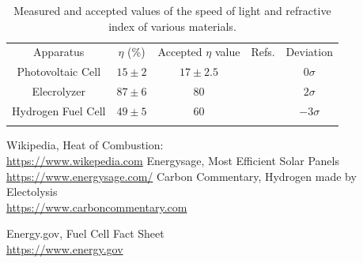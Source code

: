 \documentclass[aps,prl,reprint]{revtex4-2}
\begin{document}
\begin{widetext}
\begin{center}
\begin{table}[h]
\renewcommand{\arraystretch}{1.35}
\setlength{\tabcolsep}{10pt}
\caption{\label{}Measured and accepted values of the speed of light and refractive index of various materials.}
\begin{tabular}{|c|c|c|c|c|}
\toprule
Apparatus &  $\eta$ (\%) & Accepted $\eta$ value & Refs. & Deviation \\
\colrule
Photovoltaic Cell &  $15 \pm 2$ & $17 \pm 2.5$ & \cite{Solar Cell} & $0\sigma$  \\
\colrule
Elecrolyzer &  $87 \pm 6$ & 80 & \cite{Electrolyzer} & $2\sigma$  \\
\colrule
Hydrogen Fuel Cell &  $49 \pm 5$ & 60 & \cite{Fuel Cell} & $-3\sigma$  \\
\botrule
\end{tabular}
\end{table}
\end{center}
\end{widetext}





\begin{thebibliography}{9}
%
Wikipedia, Heat of Combustion: \\
\href{https://en.wikipedia.org/wiki/Heat_of_combustion}{https://www.wikepedia.com}
%
Energysage, Most Efficient Solar Panels\\
\href{https://news.energysage.com/what-are-the-most-efficient-solar-panels-on-the-market/#:~:text=How%20efficient%20are%20solar%20panels,are%20not%20above%2020%25%20efficiency.}{https://www.energysage.com/}
%
Carbon Commentary, Hydrogen made by Electolysis\\
\href{https://www.carboncommentary.com/blog/2017/7/5/hydrogen-made-by-the-electrolysis-of-water-is-now-cost-competitive-and-gives-us-another-building-block-for-the-low-carbon-economy}{https://www.carboncommentary.com}
%

%
Energy.gov, Fuel Cell Fact Sheet\\
\href{https://www.energy.gov/sites/prod/files/2015/11/f27/fcto_fuel_cells_fact_sheet.pdf}{https://www.energy.gov}

\end{thebibliography}
\end{document}
